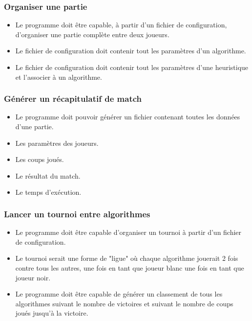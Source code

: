 \huge\documentclass{article}
\begin{document}
\subsubsection{Organiser une partie}
\begin{itemize}
    \item Le programme doit être capable, à partir d'un fichier de configuration, d'organiser une partie complète entre deux joueurs.
    \item Le fichier de configuration doit contenir tout les paramètres d'un algorithme.
    \item Le fichier de configuration doit contenir tout les paramètres d'une heuristique et l'associer à un algorithme.
\end{itemize}
\medskip
\subsubsection{Générer un récapitulatif de match}
\begin{itemize}
    \item Le programme doit pouvoir générer un fichier contenant toutes les données d'une partie.
    \item Les paramètres des joueurs.
    \item Les coups joués.
    \item Le résultat du match.
    \item Le temps d'exécution.
\end{itemize}
\medskip
\subsubsection{Lancer un tournoi entre algorithmes}
\begin{itemize}
    \item Le programme doit être capable d'organiser un tournoi à partir d'un fichier de configuration.
    \item Le tournoi serait une forme de "ligue" où chaque algorithme jouerait 2 fois contre tous les autres, une fois en tant que joueur blanc une fois en tant que joueur noir.
    \item Le programme doit être capable de générer un classement de tous les algorithmes suivant le nombre de victoires et suivant le nombre de coups joués jusqu'à la victoire.
\end{itemize}
\medskip
\end{document}

